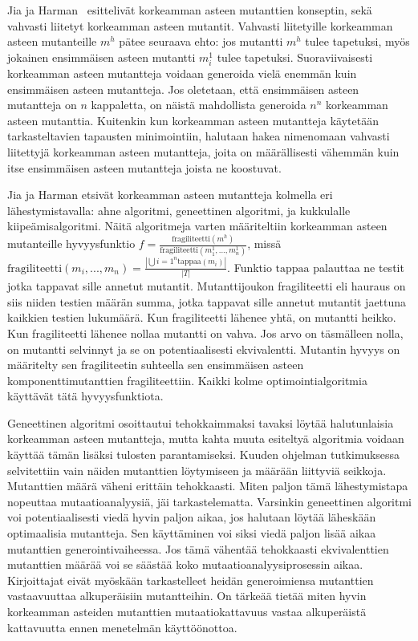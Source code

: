 \documentclass[finnish]{tktltiki2}
\begin{document}
Jia ja Harman~\cite{JiaH08b} esittelivät korkeamman asteen mutanttien konseptin, sekä vahvasti liitetyt korkeamman asteen mutantit. Vahvasti liitetyille korkeamman asteen mutanteille $m^h$ pätee seuraava ehto: jos mutantti $m^h$ tulee tapetuksi, myös jokainen ensimmäisen asteen mutantti $m^1_i$ tulee tapetuksi. Suoraviivaisesti korkeamman asteen mutantteja voidaan generoida vielä enemmän kuin ensimmäisen asteen mutantteja. Jos oletetaan, että ensimmäisen asteen mutantteja on $n$ kappaletta, on näistä mahdollista generoida $n^n$ korkeamman asteen mutanttia. Kuitenkin kun korkeamman asteen mutantteja käytetään tarkasteltavien tapausten minimointiin, halutaan hakea nimenomaan vahvasti liitettyjä korkeamman asteen mutantteja, joita on määrällisesti vähemmän kuin itse ensimmäisen asteen mutantteja joista ne koostuvat. 

Jia ja Harman etsivät korkeamman asteen mutantteja kolmella eri lähestymistavalla: ahne algoritmi, geneettinen algoritmi, ja kukkulalle kiipeämisalgoritmi. Näitä algoritmeja varten määriteltiin korkeamman asteen mutanteille hyvyysfunktio $f = \frac{\text{fragiliteetti}({m^h})}{\text{fragiliteetti}({m^1_1, ..., m^1_n})}$, missä $\text{fragiliteetti}(m_i, ..., m_n) = \frac{|\bigcup{i=1}^{n} \text{tappaa}(m_i)|}{|T|}$. Funktio $\text{tappaa}$ palauttaa ne testit jotka tappavat sille annetut mutantit. Mutanttijoukon fragiliteetti eli hauraus on siis niiden testien määrän summa, jotka tappavat sille annetut mutantit jaettuna kaikkien testien lukumäärä. Kun fragiliteetti lähenee yhtä, on mutantti heikko. Kun fragiliteetti lähenee nollaa mutantti on vahva. Jos arvo on täsmälleen nolla, on mutantti selvinnyt ja se on potentiaalisesti ekvivalentti. Mutantin hyvyys on määritelty sen fragiliteetin suhteella sen ensimmäisen asteen komponenttimutanttien fragiliteettiin. Kaikki kolme optimointialgoritmia käyttävät tätä hyvyysfunktiota. 

Geneettinen algoritmi osoittautui tehokkaimmaksi tavaksi löytää halutunlaisia korkeamman asteen mutantteja, mutta kahta muuta esiteltyä algoritmia voidaan käyttää tämän lisäksi tulosten parantamiseksi. Kuuden ohjelman tutkimuksessa selvitettiin vain näiden mutanttien löytymiseen ja määrään liittyviä seikkoja. Mutanttien määrä väheni erittäin tehokkaasti. Miten paljon tämä lähestymistapa nopeuttaa mutaatioanalyysiä, jäi tarkastelematta. Varsinkin geneettinen algoritmi voi potentiaalisesti viedä hyvin paljon aikaa, jos halutaan löytää läheskään optimaalisia mutantteja. Sen käyttäminen voi siksi viedä paljon lisää aikaa mutanttien generointivaiheessa. Jos tämä vähentää tehokkaasti ekvivalenttien mutanttien määrää voi se säästää koko mutaatioanalyysiprosessin aikaa. Kirjoittajat eivät myöskään tarkastelleet heidän generoimiensa mutanttien vastaavuuttaa alkuperäisiin mutantteihin. On tärkeää tietää miten hyvin korkeamman asteiden mutanttien mutaatiokattavuus vastaa alkuperäistä kattavuutta ennen menetelmän käyttöönottoa.
\end{document}
